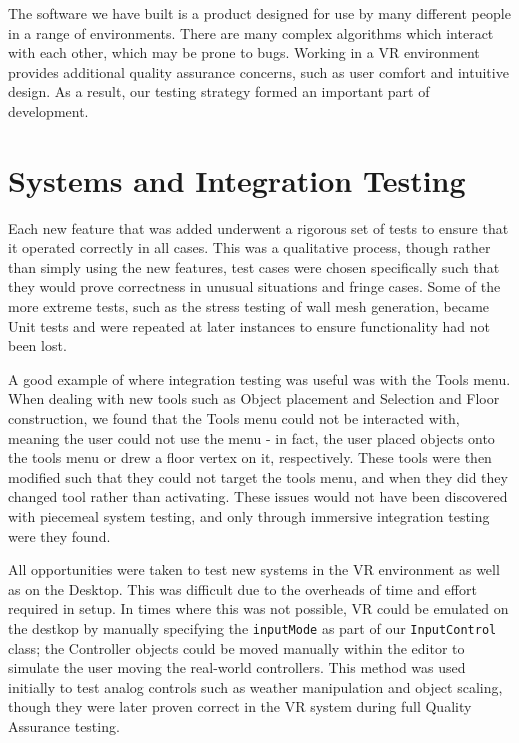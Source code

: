 The software we have built is a product designed for use by many different people in a range of environments. There are many complex algorithms which interact with each other, which may be prone to bugs. Working in a VR environment provides additional quality assurance concerns, such as user comfort and intuitive design. As a result, our testing strategy formed an important part of development. 

\section{Systems and Integration Testing}

Each new feature that was added underwent a rigorous set of tests to ensure that it operated correctly in all cases. This was a qualitative process, though rather than simply using the new features, test cases were chosen specifically such that they would prove correctness in unusual situations and fringe cases. Some of the more extreme tests, such as the stress testing of wall mesh generation, became Unit tests and were repeated at later instances to ensure functionality had not been lost.

A good example of where integration testing was useful was with the Tools menu. When dealing with new tools such as Object placement and Selection and Floor construction, we found that the Tools menu could not be interacted with, meaning the user could not use the menu - in fact, the user placed objects onto the tools menu or drew a floor vertex on it, respectively. These tools were then modified such that they could not target the tools menu, and when they did they changed tool rather than activating. These issues would not have been discovered with piecemeal system testing, and only through immersive integration testing were they found.

All opportunities were taken to test new systems in the VR environment as well as on the Desktop. This was difficult due to the overheads of time and effort required in setup. In times where this was not possible, VR could be emulated on the destkop by manually specifying the \verb|inputMode| as part of our \verb|InputControl| class; the Controller objects could be moved manually within the editor to simulate the user moving the real-world controllers. This method was used initially to test analog controls such as weather manipulation and object scaling, though they were later proven correct in the VR system during full Quality Assurance testing.


